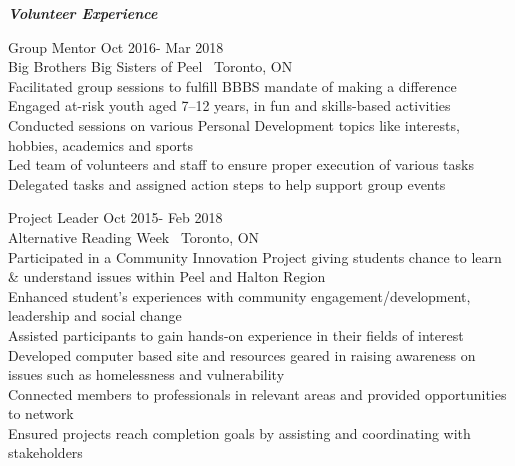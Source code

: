 \documentclass{article}
\begin{document}
\begin{center}
  \large  \textcolor{ablue}{\textit{\textbf{Volunteer Experience}}}
\end{center}

\noindent Group Mentor                   
\hfill Oct 2016- Mar 2018
\\Big Brothers Big Sisters of Peel   \textbar \ Toronto, ON        
\\Facilitated group sessions to fulfill BBBS mandate of making a difference
\\Engaged at-risk youth aged 7–12 years, in fun and skills-based activities
\\Conducted sessions on various Personal Development topics like interests, hobbies, academics and  sports
\\Led team of volunteers and staff to ensure proper execution of various tasks
\\Delegated tasks and assigned action steps to help support group events 

\bigskip

\noindent Project Leader                                                                                                                                 
\hfill Oct 2015- Feb 2018
\\Alternative Reading Week \textbar \ Toronto, ON                                                                 
\\Participated in a Community Innovation Project giving students chance to learn \& understand issues within Peel and Halton Region
\\Enhanced student’s experiences with community engagement/development, leadership and social change
\\Assisted participants to gain hands-on experience in their fields of interest
\\Developed computer based site and resources geared in raising awareness on issues such as homelessness and vulnerability
\\Connected members to professionals in relevant areas and provided opportunities to network
\\Ensured projects reach completion goals by assisting and coordinating with stakeholders
\end{document}
